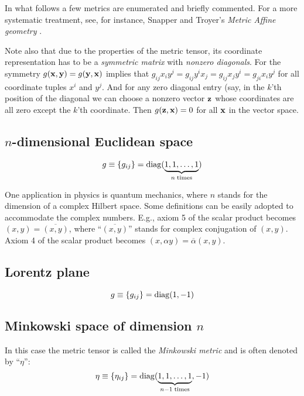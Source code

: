 In what follows a few metrics are enumerated and briefly commented.
For a more systematic treatment, see, for instance, Snapper and Troyer's {\em Metric Affine geometry} \cite{snapper-troyer}.

Note also that due to the properties of the metric tensor, its coordinate representation has to be a {\em symmetric matrix}
with {\em nonzero diagonals}.
For the symmetry $g( {\bf x}  ,{\bf y} )=g({\bf y} ,{\bf x} )$ implies that $g_{ij}x_iy^j= g_{ij}y^ix_j=  g_{ij}x_jy^i= g_{ji}x_iy^j$ for all coordinate tuples
$x^i$ and $y^j$. And for any zero diagonal entry (say, in the $k$'th position of the diagonal we can choose a nonzero vector  ${\bf z}$
whose coordinates are all zero except the $k$'th coordinate. Then $g ({\bf z},{\bf x})=0$ for all ${\bf x}$ in the vector space.


\subsection*{$n$-dimensional Euclidean space}

\begin{equation}
g\equiv \{g_{ij}\}={\rm diag} (\underbrace{1,1,\ldots ,1}_{n\; {\rm times}})
\end{equation}

One application in physics is quantum mechanics,
where $n$ stands for the dimension of a complex Hilbert space.
Some definitions can be easily adopted to accommodate the complex numbers.
E.g., axiom 5 of the scalar product becomes
$(x,y)=\overline{(x,y)}$, where ``$\overline{(x,y)}$'' stands for complex conjugation of $(x,y)$.
Axiom 4 of the scalar product becomes
$(x,\alpha y)=\overline{\alpha} (x,y)$.

\subsection*{Lorentz plane}


\begin{equation}
g\equiv \{g_{ij}\}={\rm diag} (1,-1)
\end{equation}

\subsection*{Minkowski space of dimension $n$}

In this case the metric tensor is called the
{\em Minkowski metric}
and is often denoted by  ``$\eta$'':
\begin{equation}
\eta \equiv \{\eta_{ij}\}={\rm diag} (\underbrace{1,1,\ldots ,1}_{n-1\; {\rm times}},-1)
\label{2012-m-ch-tensor-minspn}
\end{equation}


